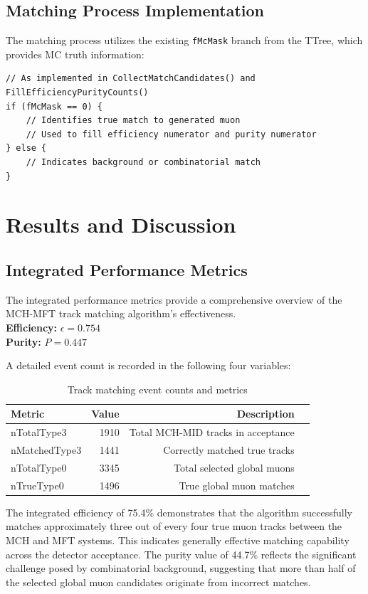 \documentclass{article}
\begin{document}
\subsection{Matching Process Implementation}
The matching process utilizes the existing \texttt{fMcMask} branch from the TTree, which provides MC truth information:

\begin{verbatim}
// As implemented in CollectMatchCandidates() and FillEfficiencyPurityCounts()
if (fMcMask == 0) {
    // Identifies true match to generated muon
    // Used to fill efficiency numerator and purity numerator
} else {
    // Indicates background or combinatorial match
}
\end{verbatim}

\section{Results and Discussion}

\subsection{Integrated Performance Metrics}
The integrated performance metrics provide a comprehensive overview of the MCH-MFT track matching algorithm's effectiveness.\\

\textbf{Efficiency:} $\epsilon = 0.754$ \\
\textbf{Purity:} $P = 0.447$

A detailed event count is recorded in the following four variables:
\begin{table}[h]
    \centering
    \caption{Track matching event counts and metrics}
    \label{tab:track_metrics}
    \begin{tabular}{lrrl}
        \toprule
        \textbf{Metric} & \textbf{Value}  & \textbf{Description} \\
        \midrule
        nTotalType3 & 1910 & Total MCH-MID tracks in acceptance \\
        nMatchedType3 & 1441 & Correctly matched true tracks \\
        nTotalType0 & 3345  & Total selected global muons \\
        nTrueType0 & 1496 & True global muon matches \\
        \bottomrule
    \end{tabular}
\end{table}

The integrated efficiency of 75.4\% demonstrates that the algorithm successfully matches approximately three out of every four true muon tracks between the MCH and MFT systems. This indicates generally effective matching capability across the detector acceptance. The purity value of 44.7\% reflects the significant challenge posed by combinatorial background, suggesting that more than half of the selected global muon candidates originate from incorrect matches.
\end{document}
